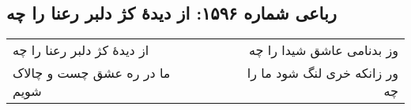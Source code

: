\begin{center}
\section*{رباعی شماره ۱۵۹۶: از دیدهٔ کژ دلبر رعنا را چه}
\label{sec:1596}
\begin{longtable}{l p{0.5cm} r}
از دیدهٔ کژ دلبر رعنا را چه
&&
وز بدنامی عاشق شیدا را چه
\\
ما در ره عشق چست و چالاک شویم
&&
ور زانکه خری لنگ شود ما را چه
\\
\end{longtable}
\end{center}

